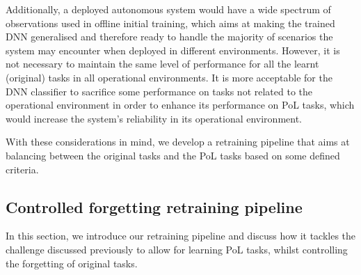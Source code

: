 Additionally, a deployed autonomous system would have a wide spectrum of observations used in offline initial training, which aims at making the trained DNN generalised and therefore ready to handle the majority of scenarios the system may encounter when deployed in different environments. 
%
However, it is not necessary to maintain the same level of performance for all the learnt (original) tasks in all operational environments. 
%
%
It is more acceptable for the DNN classifier to sacrifice some performance on tasks not related to the operational environment in order to enhance its performance on PoL tasks, which would increase the system's reliability in its operational environment.

With these considerations in mind, we develop a retraining pipeline that aims at balancing between the original tasks and the PoL tasks based on some defined criteria.


\subsection{Controlled forgetting retraining pipeline}
In this section, we introduce our retraining pipeline and discuss how it tackles the challenge discussed previously to allow for learning PoL tasks, whilst controlling the forgetting of original tasks.

